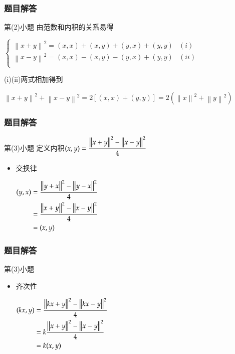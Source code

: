 \documentclass{beamer}
\begin{document}
\begin{frame}[c]
\frametitle{题目解答}
\begin{block}{第(2)小题}
由范数和内积的关系易得

$\begin{cases}
{\left\|x+y\right\|}^{2}=(x,x)+(x,y)+(y,x)+(y,y)&(i)\\
{\left\|x-y\right\|}^{2}=(x,x)-(x,y)-(y,x)+(y,y)&(ii)\\
\end{cases}$

(i)(ii)两式相加得到

${\left\|x+y\right\|}^{2}+{\left\|x-y\right\|}^{2}=2[(x,x)+(y,y)]=2(
{\left\|x\right\|}^{2}+
{\left\|y\right\|}^{2})$

\end{block}
\end{frame}

\begin{frame}[c]
\frametitle{题目解答}
\begin{block}{第(3)小题}
定义内积$(x,y)=\cfrac{{\left\|x+y\right\|}^{2}-{\left\|x-y\right\|}^{2}}{4}$

\begin{itemize}
\item 交换律

$\begin{aligned}(y,x)&=\cfrac{{\left\|y+x\right\|}^{2}-{\left\|y-x\right\|}^{2}}{4}\\&=\cfrac{{\left\|x+y\right\|}^{2}-{\left\|x-y\right\|}^{2}}{4}\\&=(x,y)\end{aligned}$
\end{itemize}
\end{block}
\end{frame}

\begin{frame}[c]
\frametitle{题目解答}
\begin{block}{第(3)小题}
\begin{itemize}
\item 齐次性

$\begin{aligned}
	(kx,y)&=\cfrac{{\left\|kx+y\right\|}^{2}-{\left\|kx-y\right\|}^{2}}{4}\\
	&=k\cfrac{{\left\|x+y\right\|}^{2}-{\left\|x-y\right\|}^{2}}{4}\\
	&=k(x,y)
\end{aligned}$
\end{itemize}	
\end{block}
\end{frame}
\end{document}
